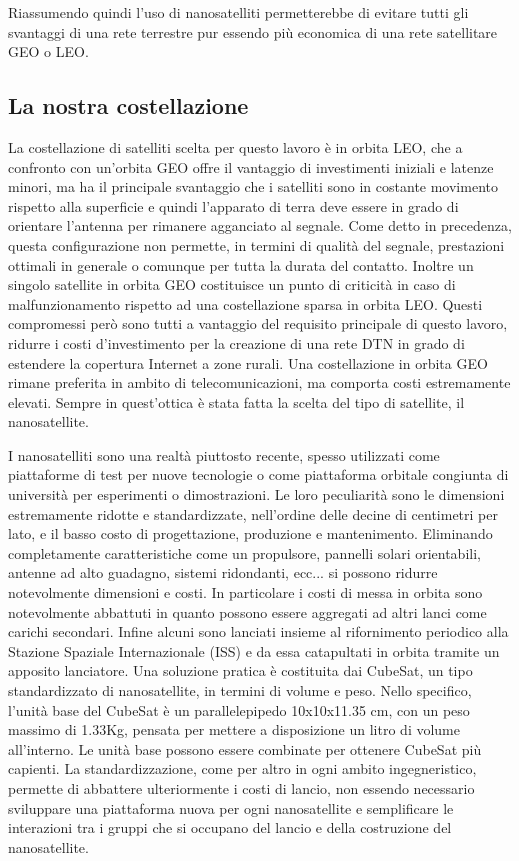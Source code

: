 \documentclass[12pt,a4paper,oneside]{book}
\begin{document}
		Riassumendo quindi l'uso di nanosatelliti permetterebbe di evitare tutti gli svantaggi di una rete terrestre pur essendo più economica di una rete satellitare GEO o LEO. 
		
		\subsection{La nostra costellazione} \label{nostrCostell}
		La costellazione di satelliti scelta per questo lavoro è in orbita LEO, che a confronto con un'orbita GEO offre il vantaggio di investimenti iniziali e latenze minori, ma ha il principale svantaggio che i satelliti sono in costante movimento rispetto alla superficie e quindi l'apparato di terra deve essere in grado di orientare l'antenna per rimanere agganciato al segnale. Come detto in precedenza, questa configurazione non permette, in termini di qualità del segnale, prestazioni ottimali in generale o comunque per tutta la durata del contatto. Inoltre un singolo satellite in orbita GEO costituisce un punto di criticità in caso di malfunzionamento rispetto ad una costellazione sparsa in orbita LEO. Questi compromessi però sono tutti a vantaggio del requisito principale di questo lavoro, ridurre i costi d'investimento per la creazione di una rete DTN in grado di estendere la copertura Internet a zone rurali. Una costellazione in orbita GEO rimane preferita in ambito di telecomunicazioni, ma comporta costi estremamente elevati. Sempre in quest'ottica è stata fatta la scelta del tipo di satellite, il nanosatellite.
		
		I nanosatelliti sono una realtà piuttosto recente, spesso utilizzati come piattaforme di test per nuove tecnologie o come piattaforma orbitale congiunta di università per esperimenti o dimostrazioni. Le loro peculiarità sono le dimensioni estremamente ridotte e standardizzate, nell'ordine delle decine di centimetri per lato, e il basso costo di progettazione, produzione e mantenimento. Eliminando completamente caratteristiche come un propulsore, pannelli solari orientabili, antenne ad alto guadagno, sistemi ridondanti, ecc... si possono ridurre notevolmente dimensioni e costi. In particolare i costi di messa in orbita sono notevolmente abbattuti in quanto possono essere aggregati ad altri lanci come carichi secondari. Infine alcuni sono lanciati insieme al rifornimento periodico alla Stazione Spaziale Internazionale (ISS) e da essa catapultati in orbita tramite un apposito lanciatore. 
		Una soluzione pratica è costituita dai CubeSat, un tipo standardizzato di nanosatellite, in termini di volume e peso. Nello specifico, l'unità base del CubeSat è un parallelepipedo 10x10x11.35 cm, con un peso massimo di 1.33Kg, pensata per mettere a disposizione un litro di volume all'interno. Le unità base possono essere combinate per ottenere CubeSat più capienti. La standardizzazione, come per altro in ogni ambito ingegneristico, permette di abbattere ulteriormente i costi di lancio, non essendo necessario sviluppare una piattaforma nuova per ogni nanosatellite e semplificare le interazioni tra i gruppi che si occupano del lancio e della costruzione del nanosatellite.
		
\end{document}
